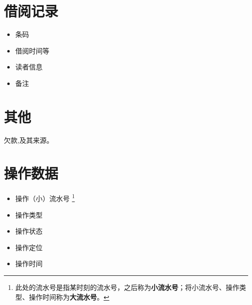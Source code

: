 \documentclass[UTF8]{report}
\begin{document}
    \section{借阅记录}
    \begin{itemize}
    	\item 条码
    	\item 借阅时间等
    	\item 读者信息
    	\item 备注
    \end{itemize}
    \section{其他}
    欠款,及其来源。
    \section{操作数据}
    \begin{itemize}
        \item 操作（小）流水号 \label{流水号}
        \footnote{\label{流水号:footnote}
            此处的流水号是指某时刻的流水号，之后称为\textbf{小流水号}；将小流水号、操作类型、操作时间称为\textbf{大流水号}。
            }
        \item 操作类型
        \item 操作状态
        \item 操作定位
        \item 操作时间
    \end{itemize}
\end{document}
